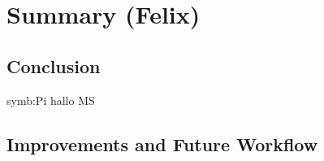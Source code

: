 \chapter{Summary (Felix)}

\section{Conclusion}
\gls{symb:Pi} hallo \gls{MS}

\section{Improvements and Future Workflow}